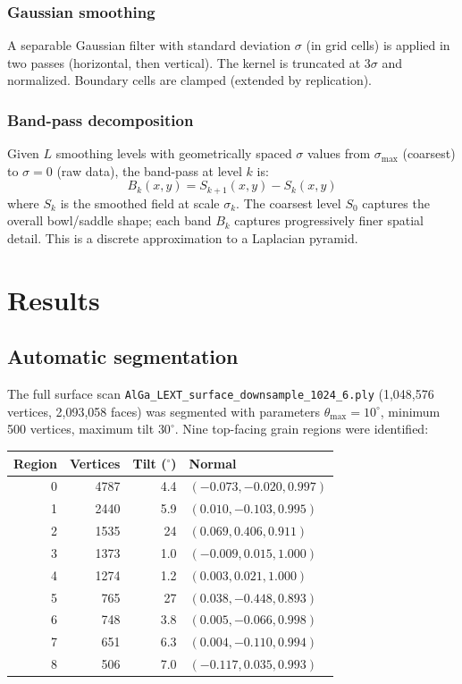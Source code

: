 \documentclass[11pt]{article}
\begin{document}
\subsubsection{Gaussian smoothing}

A separable Gaussian filter with standard deviation $\sigma$ (in
grid cells) is applied in two passes (horizontal, then vertical).
The kernel is truncated at $3\sigma$ and normalized.  Boundary
cells are clamped (extended by replication).

\subsubsection{Band-pass decomposition}

Given $L$ smoothing levels with geometrically spaced
$\sigma$ values from $\sigma_{\max}$ (coarsest) to $\sigma = 0$
(raw data), the band-pass at level $k$ is:
\[
  B_k(x,y) = S_{k+1}(x,y) - S_k(x,y)
\]
where $S_k$ is the smoothed field at scale $\sigma_k$.  The coarsest
level $S_0$ captures the overall bowl/saddle shape; each band $B_k$
captures progressively finer spatial detail.  This is a discrete
approximation to a Laplacian pyramid.

\section{Results}

\subsection{Automatic segmentation}

The full surface scan \texttt{AlGa\_LEXT\_surface\_downsample\_1024\_6.ply}
(1,048,576 vertices, 2,093,058 faces) was segmented with parameters
$\theta_{\max} = 10^{\circ}$, minimum 500 vertices, maximum tilt
$30^{\circ}$.  Nine top-facing grain regions were identified:

\begin{center}
\begin{tabular}{rrrl}
\toprule
\textbf{Region} & \textbf{Vertices} & \textbf{Tilt ($^{\circ}$)}
  & \textbf{Normal} \\
\midrule
0 & 4787 & 4.4 & $(-0.073, -0.020, 0.997)$ \\
1 & 2440 & 5.9 & $(0.010, -0.103, 0.995)$ \\
2 & 1535 & 24 & $(0.069, 0.406, 0.911)$ \\
3 & 1373 & 1.0 & $(-0.009, 0.015, 1.000)$ \\
4 & 1274 & 1.2 & $(0.003, 0.021, 1.000)$ \\
5 & 765 & 27 & $(0.038, -0.448, 0.893)$ \\
6 & 748 & 3.8 & $(0.005, -0.066, 0.998)$ \\
7 & 651 & 6.3 & $(0.004, -0.110, 0.994)$ \\
8 & 506 & 7.0 & $(-0.117, 0.035, 0.993)$ \\
\bottomrule
\end{tabular}
\end{center}
\end{document}

